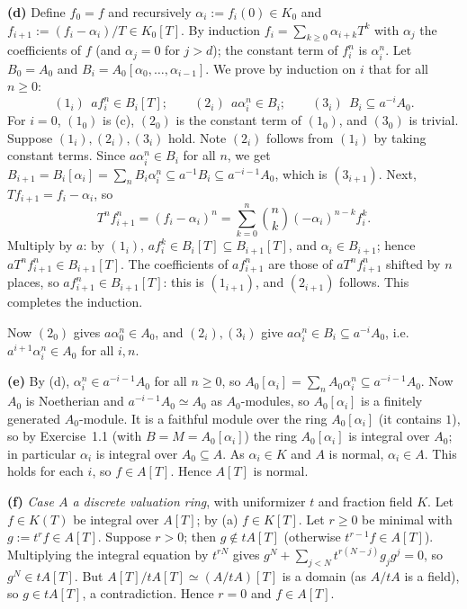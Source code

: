 \documentclass[11pt]{article}
\begin{document}
\textbf{(d)} Define $f_0=f$ and recursively $\alpha_i:=f_i(0)\in K_0$ and $f_{i+1}:=(f_i-\alpha_i)/T\in K_0[T]$. By induction $f_i=\sum_{k\ge0}\alpha_{i+k}T^k$ with $\alpha_j$ the coefficients of $f$ (and $\alpha_j=0$ for $j>d$); the constant term of $f_i^n$ is $\alpha_i^n$. Let $B_0=A_0$ and $B_i=A_0[\alpha_0,\dots,\alpha_{i-1}]$. We prove by induction on $i$ that for all $n\ge0$:
\[ (1_i)\ \ af_i^n\in B_i[T];\qquad (2_i)\ \ a\alpha_i^n\in B_i;\qquad (3_i)\ \ B_i\subseteq a^{-i}A_0. \]
For $i=0$, $(1_0)$ is (c), $(2_0)$ is the constant term of $(1_0)$, and $(3_0)$ is trivial. Suppose $(1_i),(2_i),(3_i)$ hold. Note $(2_i)$ follows from $(1_i)$ by taking constant terms. Since $a\alpha_i^n\in B_i$ for all $n$, we get $B_{i+1}=B_i[\alpha_i]=\sum_nB_i\alpha_i^n\subseteq a^{-1}B_i\subseteq a^{-i-1}A_0$, which is $(3_{i+1})$. Next, $Tf_{i+1}=f_i-\alpha_i$, so
\[ T^nf_{i+1}^n=(f_i-\alpha_i)^n=\sum_{k=0}^n\binom nk(-\alpha_i)^{n-k}f_i^k. \]
Multiply by $a$: by $(1_i)$, $af_i^k\in B_i[T]\subseteq B_{i+1}[T]$, and $\alpha_i\in B_{i+1}$; hence $aT^nf_{i+1}^n\in B_{i+1}[T]$. The coefficients of $af_{i+1}^n$ are those of $aT^nf_{i+1}^n$ shifted by $n$ places, so $af_{i+1}^n\in B_{i+1}[T]$: this is $(1_{i+1})$, and $(2_{i+1})$ follows. This completes the induction.

Now $(2_0)$ gives $a\alpha_0^n\in A_0$, and $(2_i),(3_i)$ give $a\alpha_i^n\in B_i\subseteq a^{-i}A_0$, i.e.\ $a^{i+1}\alpha_i^n\in A_0$ for all $i,n$.

\textbf{(e)} By (d), $\alpha_i^n\in a^{-i-1}A_0$ for all $n\ge0$, so $A_0[\alpha_i]=\sum_nA_0\alpha_i^n\subseteq a^{-i-1}A_0$. Now $A_0$ is Noetherian and $a^{-i-1}A_0\simeq A_0$ as $A_0$-modules, so $A_0[\alpha_i]$ is a finitely generated $A_0$-module. It is a faithful module over the ring $A_0[\alpha_i]$ (it contains $1$), so by Exercise~1.1 (with $B=M=A_0[\alpha_i]$) the ring $A_0[\alpha_i]$ is integral over $A_0$; in particular $\alpha_i$ is integral over $A_0\subseteq A$. As $\alpha_i\in K$ and $A$ is normal, $\alpha_i\in A$. This holds for each $i$, so $f\in A[T]$. Hence $A[T]$ is normal.

\textbf{(f)} \emph{Case $A$ a discrete valuation ring}, with uniformizer $t$ and fraction field $K$. Let $f\in K(T)$ be integral over $A[T]$; by (a) $f\in K[T]$. Let $r\ge0$ be minimal with $g:=t^rf\in A[T]$. Suppose $r>0$; then $g\notin tA[T]$ (otherwise $t^{r-1}f\in A[T]$). Multiplying the integral equation by $t^{rN}$ gives $g^N+\sum_{j<N}t^{r(N-j)}g_jg^j=0$, so $g^N\in tA[T]$. But $A[T]/tA[T]\simeq(A/tA)[T]$ is a domain (as $A/tA$ is a field), so $g\in tA[T]$, a contradiction. Hence $r=0$ and $f\in A[T]$.
\end{document}
